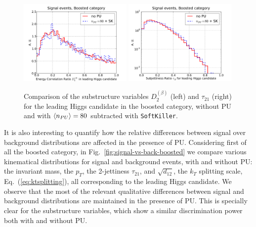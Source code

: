 \begin{figure}[t]
  \begin{center}
  \includegraphics[width=0.49\textwidth]{plots/D2_h0_bst_comp.pdf}
  \includegraphics[width=0.49\textwidth]{plots/tau21_h0_bst_comp.pdf}
   \caption{\small
     Comparison of the substructure variables $D_2^{(\beta)}$ (left)
     and $\tau_{21}$ (right)
     for the leading Higgs candidate in the boosted category,
   without PU and with $\left\langle n_{PU}\right\rangle=80$ subtracted with {\tt SoftKiller}.
}
\label{fig:Substructure_PU}
\end{center}
\end{figure}

It is also interesting to quantify how
the relative differences between
signal over background distributions are affected in 
the presence of PU.
%
Considering first of all the boosted category,
in Fig.~\ref{fig:signal-vs-back-boosted} we compare
various kinematical distributions for signal and background events,
     with and without PU: the invariant mass, the $p_T$,
     the 2-jettiness $\tau_{21}$, and $\sqrt{d_{12}}$,
     the $k_T$ splitting scale, Eq.~(\ref{eq:ktsplitting}),
     all corresponding to
     the leading Higgs candidate.
      We observe that the most of the relevant
      qualitative differences between signal
      and background distributions are maintained in the presence of PU.
      This is specially clear for the substructure variables, which
      show a similar discrimination power both with and without
      PU.
     

